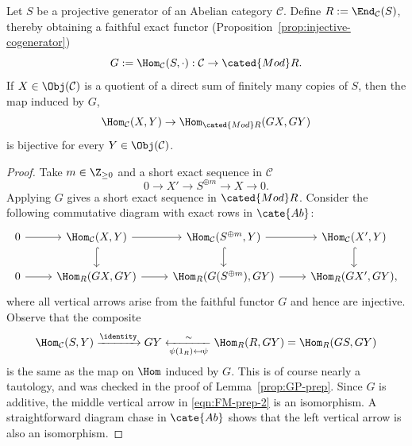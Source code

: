 \begin{lemma}\label{prop:FM-prep-2}
	Let $S$ be a projective generator of an Abelian category $\mathcal{C}$. Define $R:=\End_{\mathcal{C}}(S)$, thereby obtaining a faithful exact functor (Proposition~\ref{prop:injective-cogenerator})
	\[ G := \Hom_{\mathcal{C}}(S, \cdot): \mathcal{C} \to \cated{Mod}R. \]
	If $X\in\Obj(\mathcal{C})$ is a quotient of a direct sum of finitely many copies of $S$, then the map induced by $G$,
	\[ \Hom_{\mathcal{C}}(X, Y) \to \Hom_{\cated{Mod}R}(GX, GY) \]
	is bijective for every $Y\in\Obj(\mathcal{C})$.
\end{lemma}
\begin{proof}
	Take $m\in\Z_{\geq 0}$ and a short exact sequence in $\mathcal{C}$
	\[ 0 \to X' \to S^{\oplus m} \to X \to 0. \]
	Applying $G$ gives a short exact sequence in $\cated{Mod}R$. Consider the following commutative diagram with exact rows in $\cate{Ab}$:
	\begin{equation}\label{eqn:FM-prep-2}\begin{tikzcd}
			0 \arrow[r] & \Hom_{\mathcal{C}}(X, Y) \arrow[r] \arrow[hookrightarrow, d] & \Hom_{\mathcal{C}}(S^{\oplus m}, Y) \arrow[r] \arrow[hookrightarrow, d] & \Hom_{\mathcal{C}}(X', Y) \arrow[hookrightarrow, d] \\
			0 \arrow[r] & \Hom_R(GX, GY) \arrow[r] & \Hom_R(G(S^{\oplus m}), GY) \arrow[r] & \Hom_R(GX', GY),
	\end{tikzcd}\end{equation}
	where all vertical arrows arise from the faithful functor $G$ and hence are injective. Observe that the composite
	\[ \Hom_{\mathcal{C}}(S, Y) \xrightarrow{\identity} GY \xleftarrow[\psi(1_R) \mapsfrom \psi]{\sim} \Hom_R(R, GY) = \Hom_R(GS, GY) \]
	is the same as the map on $\Hom$ induced by $G$. This is of course nearly a tautology, and was checked in the proof of Lemma~\ref{prop:GP-prep}. Since $G$ is additive, the middle vertical arrow in \eqref{eqn:FM-prep-2} is an isomorphism. A straightforward diagram chase in $\cate{Ab}$ shows that the left vertical arrow is also an isomorphism.
\end{proof}

